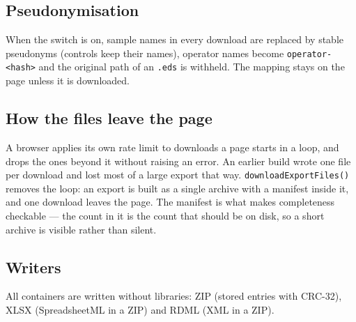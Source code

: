 
\subsection*{Pseudonymisation}
When the switch is on, sample names in every download are replaced by stable pseudonyms (controls keep their names), operator
names become \texttt{operator-<hash>} and the original path of an \texttt{.eds} is withheld. The mapping stays on the page unless
it is downloaded.




\subsection*{How the files leave the page}
A browser applies its own rate limit to downloads a page starts in a loop, and
drops the ones beyond it without raising an error. An earlier build wrote one
file per download and lost most of a large export that way. \texttt{downloadExportFiles()}
removes the loop: an export is built as a single archive with a manifest inside
it, and one download leaves the page. The manifest is what makes completeness
checkable --- the count in it is the count that should be on disk, so a short
archive is visible rather than silent.

\subsection*{Writers}
All containers are written without libraries: ZIP (stored entries with CRC-32), XLSX (SpreadsheetML in a ZIP) and RDML (XML in a ZIP).










